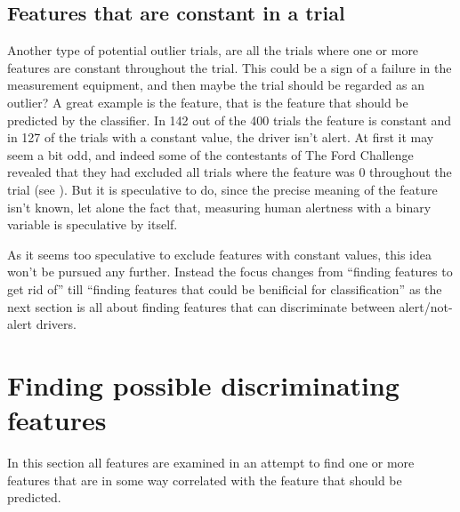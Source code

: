 \subsection{Features that are constant in a trial}
Another type of potential outlier trials, are all the trials where one or more features are constant throughout the trial. This could be a sign of a failure in the measurement equipment, and then maybe the trial should be regarded as an outlier? A great example is the  feature, that is the feature that should be predicted by the classifier. In 142 out of the 400 trials the  feature is constant and in 127 of the trials with a constant value, the driver isn't alert. At first it may seem a bit odd, and indeed some of the contestants of The Ford Challenge revealed that they had excluded all trials where the  feature was 0 throughout the trial (see \citet{kaggle_forum_328_reply_2}). But it is speculative to do, since the precise meaning of the  feature isn't known, let alone the fact that, measuring human alertness with a binary variable is speculative by itself. \par
As it seems too speculative to exclude features with constant values, this idea won't be pursued any further. Instead the focus changes from ``finding features to get rid of'' till ``finding features that could be benificial for classification'' as the next section is all about finding features that can discriminate between alert/not-alert drivers.


\section{Finding possible discriminating features}
In this section all features are examined in an attempt to find one or more features that are in some way correlated with the  feature that should be predicted.

